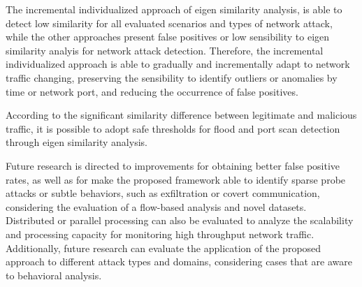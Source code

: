 The incremental individualized approach of eigen similarity analysis, is able to detect low similarity for all evaluated scenarios and types of network attack, while the other approaches present false positives or low sensibility to eigen similarity analyis for network attack detection. Therefore, the incremental individualized approach is able to gradually and incrementally adapt to network traffic changing, preserving the sensibility to identify outliers or anomalies by time or network port, and reducing the occurrence of false positives.

According to the significant similarity difference between legitimate and malicious traffic, it is possible to adopt safe thresholds for flood and port scan detection through eigen similarity analysis.

Future research is directed to improvements for obtaining better false positive rates, as well as for make the proposed framework able to identify sparse probe attacks or subtle behaviors, such as exfiltration or covert communication, considering the evaluation of a flow-based analysis and novel datasets. Distributed or parallel processing can also be evaluated to analyze the scalability and processing capacity for monitoring high throughput network traffic. Additionally, future research can evaluate the application of the proposed approach to different attack types and domains, considering cases that are aware to behavioral analysis.